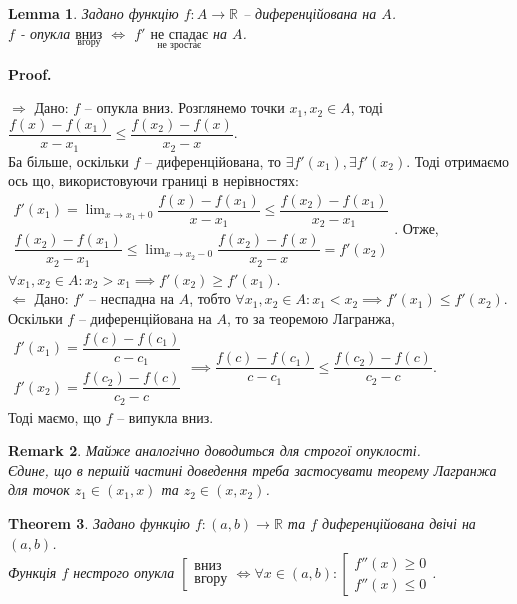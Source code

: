 \documentclass[a4paper, 14pt]{article}
\makeatletter
\def\qed{$\blacksquare$}
\def\rightproof{$\boxed{\Rightarrow}$ }
\def\leftproof{$\boxed{\Leftarrow}$ }
\theoremstyle{theoremdd}
\newtheorem{theorem}{Theorem}[subsection]
\theoremstyle{theoremdd}
\theoremstyle{theoremdd}
\theoremstyle{theoremdd}
\theoremstyle{theoremdd}
\theoremstyle{theoremdd}
\newtheorem{remark}[theorem]{Remark}
\theoremstyle{theoremdd}
\newtheorem{lemma}[theorem]{Lemma}
\theoremstyle{theoremdd}
\renewenvironment{proof}[1][Proof.\\]{\par
\pushQED{\hfill \qed}%
\normalfont \topsep6\p@\@plus6\p@\relax
\trivlist
\item\relax
{\bfseries
#1\@addpunct{.}}\hspace\labelsep\ignorespaces
}{%
\popQED\endtrivlist\@endpefalse
}
\makeatother
\begin{document}
\begin{lemma}
Задано функцію $f: A \to \mathbb{R}$ -- диференційована на $A$.\\
$f$ - опукла $\underset{\textrm{вгору}}{\textrm{вниз}}$ $\iff$ $f'$ $\underset{\textrm{не зростає}}{\textrm{не спадає}}$ на $A$.
\end{lemma}

\begin{proof}
\rightproof Дано: $f$ -- опукла вниз. Розглянемо точки $x_1, x_2 \in A$, тоді $\dfrac{f(x)-f(x_1)}{x-x_1} \leq \dfrac{f(x_2)-f(x)}{x_2-x}$.\\
Ба більше, оскільки $f$ -- диференційована, то $\exists f'(x_1), \exists f'(x_2)$. Тоді отримаємо ось що, використовуючи границі в нерівностях:\\
$\left. \begin{gathered}
f'(x_1) = \displaystyle \lim_{x \to x_1+0} \dfrac{f(x)-f(x_1)}{x-x_1} \leq \dfrac{f(x_2)-f(x_1)}{x_2-x_1} \\
\dfrac{f(x_2)-f(x_1)}{x_2-x_1} \leq \displaystyle \lim_{x \to x_2-0} \dfrac{f(x_2)-f(x)}{x_2-x} = f'(x_2)
\end{gathered} \right.$. Отже, $\forall x_1,x_2 \in A: x_2 > x_1 \implies f'(x_2) \geq f'(x_1)$.
\bigskip \\
\leftproof Дано: $f'$ -- неспадна на $A$, тобто $\forall x_1,x_2 \in A: x_1 < x_2 \implies f'(x_1) \leq f'(x_2)$. Оскільки $f$ -- диференційована на $A$, то за теоремою Лагранжа,\\
$\begin{gathered}
f'(x_1) = \dfrac{f(c) - f(c_1)}{c- c_1}\\
f'(x_2) = \dfrac{f(c_2) - f(c)}{c_2 - c}
\end{gathered} \implies \dfrac{f(c) - f(c_1)}{c- c_1} \leq \dfrac{f(c_2) - f(c)}{c_2 - c}$.\\
Тоді маємо, що $f$ -- випукла вниз.
\end{proof}

\begin{remark}
Майже аналогічно доводиться для строгої опуклості.\\
Єдине, що в першій частині доведення треба застосувати теорему Лагранжа для точок $z_1 \in (x_1,x)$ та $z_2 \in (x,x_2)$.
\end{remark}

\begin{theorem}
Задано функцію $f \colon (a,b) \to \mathbb{R}$ та $f$ диференційована двічі на $(a,b)$.\\
Функція $f$ нестрого опукла $\left[ \begin{gathered} \textrm{вниз} \\ \textrm{вгору} \end{gathered} \right. \iff \forall x \in (a,b): \left[ \begin{gathered} f''(x) \geq 0 \\ f''(x) \leq 0 \end{gathered} \right.$.
\end{theorem}
\end{document}
